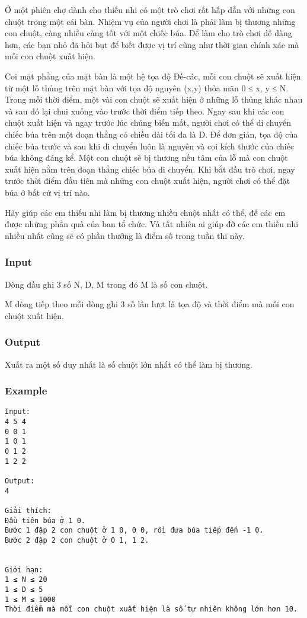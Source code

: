 



   Ở một phiên chợ dành cho thiếu nhi có một trò chơi rất hấp dẫn với những con chuột trong một cái bàn. Nhiệm vụ của người chơi là phải làm bị thương những con chuột, càng nhiều càng tốt với một chiếc búa. Để làm cho trò chơi dễ dàng hơn, các bạn nhỏ đã hỏi bụt để biết được vị trí cũng như thời gian chính xác mà mỗi con chuột xuất hiện.  

   Coi mặt phẳng của mặt bàn là một hệ tọa độ Đề-các, mỗi con chuột sẽ xuất hiện từ một lỗ thủng trên mặt bàn với tọa độ nguyên (x,y) thỏa mãn 0 ≤ x, y ≤ N. Trong mỗi thời điểm, một vài con chuột sẽ xuất hiện ở những lỗ thủng khác nhau và sau đó lại chui xuống vào trước thời điểm tiếp theo. Ngay sau khi các con chuột xuất hiện và ngay trước lúc chúng biến mất, người chơi có thể di chuyển chiếc búa trên một đoạn thẳng có chiều dài tối đa là D. Để đơn giản, tọa độ của chiếc búa trước và sau khi di chuyển luôn là nguyên và coi kích thước của chiếc búa không đáng kể. Một con chuột sẽ bị thương nếu tâm của lỗ mà con chuột xuất hiện nằm trên đoạn thẳng chiếc búa di chuyển. Khi bắt đầu trò chơi, ngay trước thời điểm đầu tiên mà những con chuột xuất hiện, người chơi có thể đặt búa ở bất cứ vị trí nào.  

   Hãy giúp các em thiếu nhi làm bị thương nhiều chuột nhất có thể, để các em được những phần quà của ban tổ chức. Và tất nhiên ai giúp đỡ các em thiếu nhi nhiều nhất cũng sẽ có phần thưởng là điểm số trong tuần thi này.  

\subsubsection{   Input  }

   Dòng đầu ghi 3 số N, D, M trong đó M là số con chuột.  

   M dòng tiếp theo mỗi dòng ghi 3 số lần lượt là tọa độ và thời điểm mà mỗi con chuột xuất hiện.  

\subsubsection{   Output  }

   Xuất ra một số duy nhất là số chuột lớn nhất có thể làm bị thương.  

\subsubsection{   Example  }
\begin{verbatim}
Input:
4 5 4
0 0 1
1 0 1
0 1 2
1 2 2

Output:
4

Giải thích:
Đầu tiên búa ở 1 0.
Bước 1 đập 2 con chuột ở 1 0, 0 0, rồi đưa búa tiếp đến -1 0.
Bước 2 đập 2 con chuột ở 0 1, 1 2.


Giới hạn:
1 ≤ N ≤ 20
1 ≤ D ≤ 5
1 ≤ M ≤ 1000
Thời điểm mà mỗi con chuột xuất hiện là số tự nhiên không lớn hơn 10.
\end{verbatim}